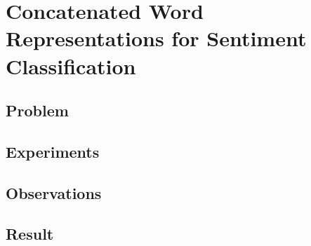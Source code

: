 	\chapter{Concatenated Word Representations for Sentiment Classification}\label{chapter:wordrepresentation}

	\section{Problem}
	\section{Experiments}
	\section{Observations}
	\section{Result}